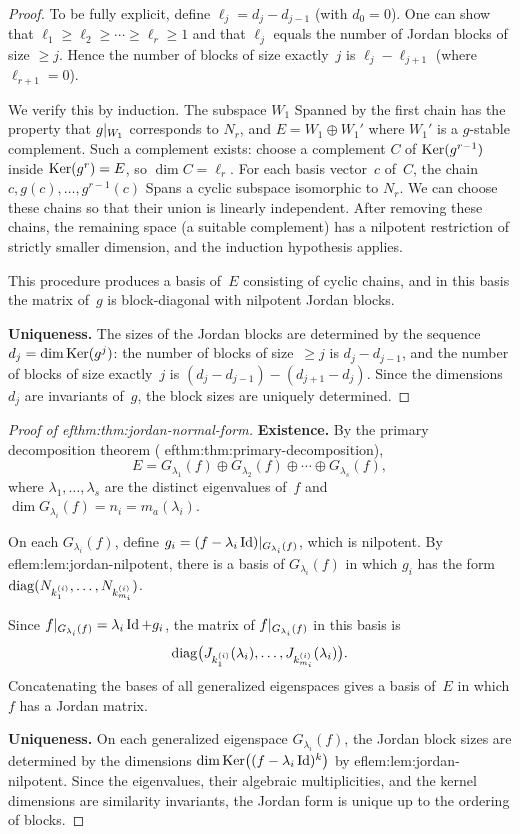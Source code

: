 \begin{proof}
To be fully explicit, define $\ell_j = d_j - d_{j-1}$ (with $d_0 = 0$).
One can show that $\ell_1 \geq \ell_2 \geq \cdots \geq \ell_r \geq 1$
and that $\ell_j$ equals the number of Jordan blocks of size $\geq j$.
Hence the number of blocks of size exactly~$j$ is
$\ell_j - \ell_{j+1}$ (where $\ell_{r+1} = 0$).

We verify this by induction.  The subspace $W_1$ Spanned by the first
chain has the property that $g{|_{W_1}}$ corresponds to $N_r$,
and $E = W_1 \oplus W_1'$ where $W_1'$ is a $g$-stable complement.
Such a complement exists: choose a complement $C$ of $\operatorname{Ker}(g^{r-1})$
inside $\operatorname{Ker}(g^r) = E$, so $\dim C = \ell_r$.  For each basis
vector~$c$ of~$C$, the chain $c, g(c), \ldots, g^{r-1}(c)$ Spans
a cyclic subspace isomorphic to $N_r$.  We can choose these chains so
that their union is linearly independent.  After removing these chains,
the remaining space (a suitable complement) has a nilpotent restriction
of strictly smaller dimension, and the induction hypothesis applies.

This procedure produces a basis of~$E$ consisting of cyclic chains,
and in this basis the matrix of~$g$ is block-diagonal with nilpotent
Jordan blocks.

\textbf{Uniqueness.}  The sizes of the Jordan blocks are determined
by the sequence $d_j = \dim\operatorname{Ker}(g^j)$: the number of blocks of
size~$\geq j$ is $d_j - d_{j-1}$, and the number of blocks of size
exactly~$j$ is $(d_j - d_{j-1}) - (d_{j+1} - d_j)$.  Since the
dimensions $d_j$ are invariants of~$g$, the block sizes are uniquely
determined.
\end{proof}

\begin{proof}[Proof of 
ef{thm:thm:jordan-normal-form}]

\textbf{Existence.}  By the primary decomposition theorem
(
ef{thm:thm:primary-decomposition}),
\[
  E = G_{\lambda_1}(f) \oplus G_{\lambda_2}(f) \oplus \cdots
    \oplus G_{\lambda_s}(f),
\]
where $\lambda_1, \ldots, \lambda_s$ are the distinct eigenvalues
of~$f$ and $\dim G_{\lambda_i}(f) = n_i = m_a(\lambda_i)$.

On each $G_{\lambda_i}(f)$, define
$g_i = (f - \lambda_i\operatorname{Id}){|_{G_{\lambda_i}(f)}}$, which is
nilpotent.  By 
ef{lem:lem:jordan-nilpotent}, there is a basis of
$G_{\lambda_i}(f)$ in which $g_i$ has the form
$\operatorname{diag}(N_{k_1^{(i)}}, \ldots, N_{k_{m_i}^{(i)}})$.

Since $f{|_{G_{\lambda_i}(f)}} = \lambda_i\operatorname{Id} + g_i$, the
matrix of $f{|_{G_{\lambda_i}(f)}}$ in this basis is
\[
  \operatorname{diag}\bigl(J_{k_1^{(i)}}(\lambda_i), \ldots,
    J_{k_{m_i}^{(i)}}(\lambda_i)\bigr).
\]
Concatenating the bases of all generalized eigenspaces gives a basis
of~$E$ in which $f$ has a Jordan matrix.

\textbf{Uniqueness.}  On each generalized eigenspace
$G_{\lambda_i}(f)$, the Jordan block sizes are determined by
the dimensions $\dim\operatorname{Ker}\bigl((f - \lambda_i\operatorname{Id})^k\bigr)$
by 
ef{lem:lem:jordan-nilpotent}.  Since the eigenvalues, their
algebraic multiplicities, and the kernel dimensions are similarity
invariants, the Jordan form is unique up to the ordering of blocks.
\end{proof}



